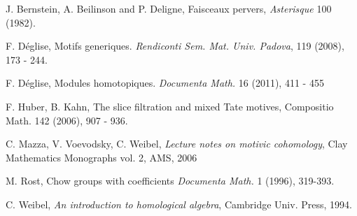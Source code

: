 
\begin{thebibliography}{10}

J. Bernstein, A. Beilinson and P. Deligne,
Faisceaux pervers, {\em Asterisque} 100 (1982).

F. D\'eglise, Motifs generiques.
{\em Rendiconti Sem. Mat. Univ. Padova},
119 (2008), 173 - 244.

F. D\'eglise, 
Modules homotopiques.
{\em Documenta Math.}
16 (2011), 411 - 455

F. Huber, B. Kahn, The slice filtration and mixed Tate motives,
Compositio Math. 142 (2006), 907 - 936.

C. Mazza, V. Voevodsky, C. Weibel,
{\em Lecture notes on motivic cohomology},
Clay Mathematics Monographs vol. 2,
AMS, 2006

M. Rost, 
Chow groups with coefficients
{\em Documenta Math.} 
1 (1996), 319-393. 

C. Weibel,
{\em An introduction to homological algebra},
Cambridge Univ. Press, 1994.

\end{thebibliography}
